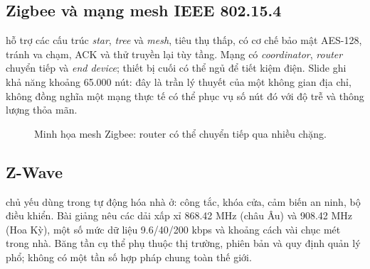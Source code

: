 \subsection{Zigbee và mạng mesh IEEE 802.15.4}
 hỗ trợ các cấu trúc \emph{star}, \emph{tree} và \emph{mesh}, tiêu thụ thấp, có cơ chế bảo mật AES-128, tránh va chạm, ACK và thử truyền lại tùy tầng. Mạng có \emph{coordinator}, \emph{router} chuyển tiếp và \emph{end device}; thiết bị cuối có thể ngủ để tiết kiệm điện. Slide ghi khả năng khoảng 65.000 nút: đây là trần lý thuyết của một không gian địa chỉ, không đồng nghĩa một mạng thực tế có thể phục vụ số nút đó với độ trễ và thông lượng thỏa mãn.
\begin{figure}[htbp]\centering
{}\caption{Minh họa mesh Zigbee: router có thể chuyển tiếp qua nhiều chặng.}
\end{figure}
\subsection{Z-Wave}
 chủ yếu dùng trong tự động hóa nhà ở: công tắc, khóa cửa, cảm biến an ninh, bộ điều khiển. Bài giảng nêu các dải xấp xỉ 868.42 MHz (châu Âu) và 908.42 MHz (Hoa Kỳ), một số mức dữ liệu 9.6/40/200 kbps và khoảng cách vài chục mét trong nhà. Băng tần cụ thể phụ thuộc thị trường, phiên bản và quy định quản lý phổ; không có một tần số hợp pháp chung toàn thế giới.
